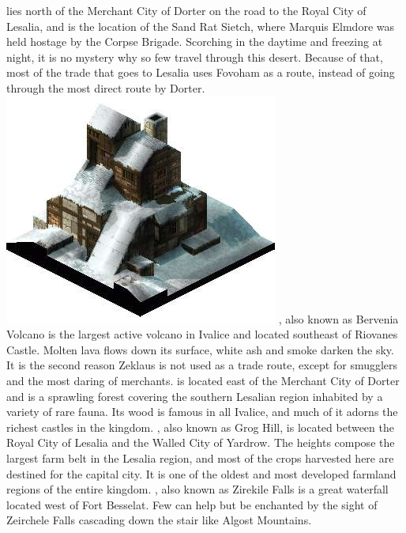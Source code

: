  lies north of the Merchant City of Dorter on the road to the Royal City of Lesalia, and is the location of the Sand Rat Sietch, where Marquis Elmdore was held hostage by the Corpse Brigade. 
Scorching in the daytime and freezing at night, it is no mystery why so few travel through this desert. Because of that, most of the trade that goes to Lesalia uses Fovoham as a route, instead of going through the most direct route by Dorter.
%
\vfill
\includegraphics[width=\columnwidth]{./art/worldbook/goland.jpg}
\vfill
%
, also known as Bervenia Volcano is the largest active volcano in Ivalice and located southeast of Riovanes Castle. Molten lava flows down its surface, white ash and smoke darken the sky. 
It is the second reason Zeklaus is not used as a trade route, except for smugglers and the most daring of merchants.
 is located east of the Merchant City of Dorter and is a sprawling forest covering the southern Lesalian region inhabited by a variety of rare fauna. 
Its wood is famous in all Ivalice, and much of it adorns the richest castles in the kingdom.
, also known as Grog Hill, is located between the Royal City of Lesalia and the Walled City of Yardrow. 
The heights compose the largest farm belt in the Lesalia region, and most of the crops harvested here are destined for the capital city. 
It is one of the oldest and most developed farmland regions of the entire kingdom.
, also known as Zirekile Falls is a great waterfall located west of Fort Besselat. Few can help but be enchanted by the sight of Zeirchele Falls cascading down the stair like Algost Mountains. 
